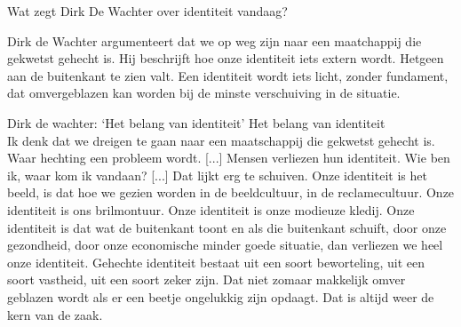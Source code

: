 \documentclass[main.tex]{subfiles}
\begin{document}
\begin{examenvraag}
    \begin{vraag}
        Wat zegt Dirk De Wachter over identiteit vandaag?
    \end{vraag}

    \begin{antwoord}
        Dirk de Wachter argumenteert dat we op weg zijn naar een maatchappij die gekwetst gehecht is.
        Hij beschrijft hoe onze identiteit iets extern wordt. Hetgeen aan de buitenkant te zien valt.
        Een identiteit wordt iets licht, zonder fundament, dat omvergeblazen kan worden bij de minste verschuiving in de situatie.
        \begin{citaat}{Dirk de wachter: `Het belang van identiteit'}
            Het belang van identiteit\\
            Ik denk dat we dreigen te gaan naar een maatschappij die gekwetst gehecht is.
            Waar hechting een probleem wordt.
            [...]
            Mensen verliezen hun identiteit.
            Wie ben ik, waar kom ik vandaan?
            [...]
            Dat lijkt erg te schuiven.
            Onze identiteit is het beeld, is dat hoe we gezien worden in de beeldcultuur, in de reclamecultuur.
            Onze identiteit is ons brilmontuur.
            Onze identiteit is onze modieuze kledij.
            Onze identiteit is dat wat de buitenkant toont en als die buitenkant schuift, door onze gezondheid, door onze economische minder goede situatie, dan verliezen we heel onze identiteit.
            Gehechte identiteit bestaat uit een soort beworteling, uit een soort vastheid, uit een soort zeker zijn.
            Dat niet zomaar makkelijk omver geblazen wordt als er een beetje ongelukkig zijn opdaagt.
            Dat is altijd weer de kern van de zaak.
        \end{citaat}
    \end{antwoord}
\end{examenvraag}
\end{document}
